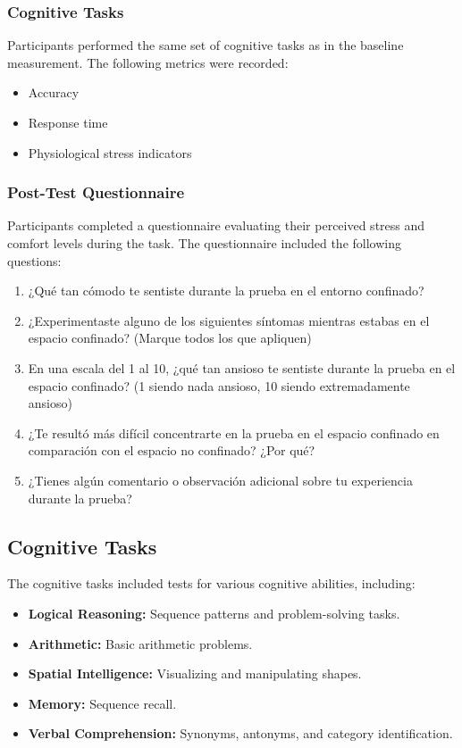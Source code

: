 \documentclass[runningheads]{llncs}
\begin{document}
\subsubsection{Cognitive Tasks}

Participants performed the same set of cognitive tasks as in the baseline measurement. The following metrics were recorded:

\begin{itemize}
    \item Accuracy
    \item Response time
    \item Physiological stress indicators
\end{itemize}

\subsubsection{Post-Test Questionnaire}

Participants completed a questionnaire evaluating their perceived stress and comfort levels during the task. The questionnaire included the following questions:

\begin{enumerate}
    \item ¿Qué tan cómodo te sentiste durante la prueba en el entorno confinado?
    \item ¿Experimentaste alguno de los siguientes síntomas mientras estabas en el espacio confinado? (Marque todos los que apliquen)
    \item En una escala del 1 al 10, ¿qué tan ansioso te sentiste durante la prueba en el espacio confinado? (1 siendo nada ansioso, 10 siendo extremadamente ansioso)
    \item ¿Te resultó más difícil concentrarte en la prueba en el espacio confinado en comparación con el espacio no confinado? ¿Por qué?
    \item ¿Tienes algún comentario o observación adicional sobre tu experiencia durante la prueba?
\end{enumerate}

\subsection{Cognitive Tasks}

The cognitive tasks included tests for various cognitive abilities, including:

\begin{itemize}
    \item \textbf{Logical Reasoning:} Sequence patterns and problem-solving tasks.
    \item \textbf{Arithmetic:} Basic arithmetic problems.
    \item \textbf{Spatial Intelligence:} Visualizing and manipulating shapes.
    \item \textbf{Memory:} Sequence recall.
    \item \textbf{Verbal Comprehension:} Synonyms, antonyms, and category identification.
\end{itemize}
\end{document}
